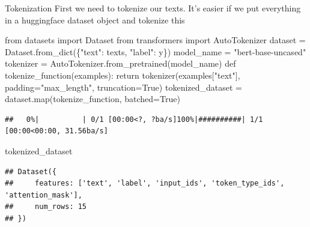\documentclass[
  10pt,
  ignorenonframetext,
  aspectratio=169]{beamer}
\newenvironment{Shaded}{\begin{snugshade}}{\end{snugshade}}
\newcommand{\BuiltInTok}[1]{\textcolor[rgb]{0.80,0.80,0.80}{#1}}
\newcommand{\ControlFlowTok}[1]{\textcolor[rgb]{0.94,0.87,0.69}{#1}}
\newcommand{\ImportTok}[1]{\textcolor[rgb]{0.80,0.80,0.80}{#1}}
\newcommand{\KeywordTok}[1]{\textcolor[rgb]{0.94,0.87,0.69}{#1}}
\newcommand{\NormalTok}[1]{\textcolor[rgb]{0.80,0.80,0.80}{#1}}
\newcommand{\OperatorTok}[1]{\textcolor[rgb]{0.94,0.94,0.82}{#1}}
\newcommand{\StringTok}[1]{\textcolor[rgb]{0.80,0.58,0.58}{#1}}
\newcommand{\VariableTok}[1]{\textcolor[rgb]{0.80,0.80,0.80}{#1}}
\begin{document}
\begin{frame}[fragile]{Tokenization}
\protect\hypertarget{tokenization}{}
First we need to tokenize our texts. It's easier if we put everything in
a huggingface dataset object and tokenize this

\medskip
\scriptsize

\begin{Shaded}
\begin{Highlighting}[]
\ImportTok{from}\NormalTok{ datasets }\ImportTok{import}\NormalTok{ Dataset}
\ImportTok{from}\NormalTok{ transformers }\ImportTok{import}\NormalTok{ AutoTokenizer}
\NormalTok{dataset }\OperatorTok{=}\NormalTok{ Dataset.from\_dict(\{}\StringTok{"text"}\NormalTok{: texts, }\StringTok{"label"}\NormalTok{: y\})}
\NormalTok{model\_name }\OperatorTok{=} \StringTok{"bert{-}base{-}uncased"}
\NormalTok{tokenizer }\OperatorTok{=}\NormalTok{ AutoTokenizer.from\_pretrained(model\_name)}
\KeywordTok{def}\NormalTok{ tokenize\_function(examples):}
    \ControlFlowTok{return}\NormalTok{ tokenizer(examples[}\StringTok{"text"}\NormalTok{], padding}\OperatorTok{=}\StringTok{"max\_length"}\NormalTok{, truncation}\OperatorTok{=}\VariableTok{True}\NormalTok{)}
\NormalTok{tokenized\_dataset }\OperatorTok{=}\NormalTok{ dataset.}\BuiltInTok{map}\NormalTok{(tokenize\_function, batched}\OperatorTok{=}\VariableTok{True}\NormalTok{)}
\end{Highlighting}
\end{Shaded}

\begin{verbatim}
##   0%|          | 0/1 [00:00<?, ?ba/s]100%|##########| 1/1 [00:00<00:00, 31.56ba/s]
\end{verbatim}

\begin{Shaded}
\begin{Highlighting}[]
\NormalTok{tokenized\_dataset}
\end{Highlighting}
\end{Shaded}

\begin{verbatim}
## Dataset({
##     features: ['text', 'label', 'input_ids', 'token_type_ids', 'attention_mask'],
##     num_rows: 15
## })
\end{verbatim}
\end{frame}
\end{document}
